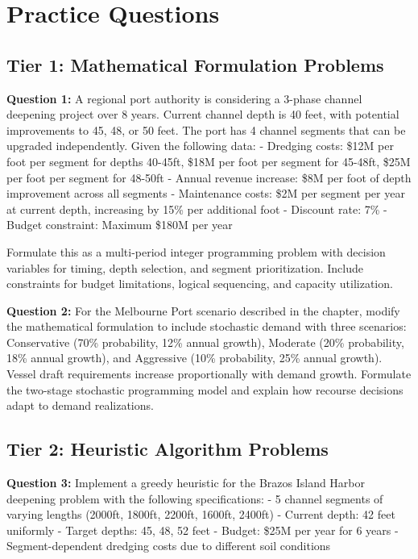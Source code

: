 \documentclass{article}
\begin{document}
\section{Practice Questions}

\subsection{Tier 1: Mathematical Formulation Problems}

\textbf{Question 1:} A regional port authority is considering a 3-phase channel deepening project over 8 years. Current channel depth is 40 feet, with potential improvements to 45, 48, or 50 feet. The port has 4 channel segments that can be upgraded independently. Given the following data:
- Dredging costs: \$12M per foot per segment for depths 40-45ft, \$18M per foot per segment for 45-48ft, \$25M per foot per segment for 48-50ft
- Annual revenue increase: \$8M per foot of depth improvement across all segments
- Maintenance costs: \$2M per segment per year at current depth, increasing by 15\% per additional foot
- Discount rate: 7\%
- Budget constraint: Maximum \$180M per year

Formulate this as a multi-period integer programming problem with decision variables for timing, depth selection, and segment prioritization. Include constraints for budget limitations, logical sequencing, and capacity utilization.

\textbf{Question 2:} For the Melbourne Port scenario described in the chapter, modify the mathematical formulation to include stochastic demand with three scenarios: Conservative (70\% probability, 12\% annual growth), Moderate (20\% probability, 18\% annual growth), and Aggressive (10\% probability, 25\% annual growth). Vessel draft requirements increase proportionally with demand growth. Formulate the two-stage stochastic programming model and explain how recourse decisions adapt to demand realizations.

\subsection{Tier 2: Heuristic Algorithm Problems}

\textbf{Question 3:} Implement a greedy heuristic for the Brazos Island Harbor deepening problem with the following specifications:
- 5 channel segments of varying lengths (2000ft, 1800ft, 2200ft, 1600ft, 2400ft)
- Current depth: 42 feet uniformly
- Target depths: 45, 48, 52 feet
- Budget: \$25M per year for 6 years
- Segment-dependent dredging costs due to different soil conditions
\end{document}
